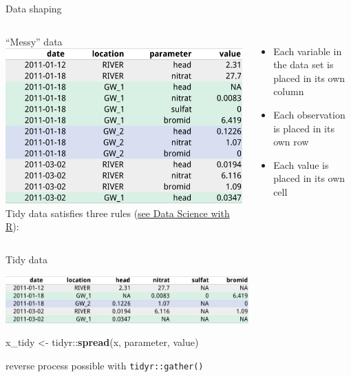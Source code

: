 \documentclass[8pt,ignorenonframetext,]{beamer}
\newenvironment{Shaded}{\begin{snugshade}}{\end{snugshade}}
\newcommand{\KeywordTok}[1]{\textcolor[rgb]{0.13,0.29,0.53}{\textbf{{#1}}}}
\newcommand{\StringTok}[1]{\textcolor[rgb]{0.31,0.60,0.02}{{#1}}}
\newcommand{\NormalTok}[1]{{#1}}
\providecommand{\tightlist}{%
  \setlength{\itemsep}{0pt}\setlength{\parskip}{0pt}}
\newcommand{\columnsbegin}{\begin{columns}}
\newcommand{\columnsend}{\end{columns}}
\begin{document}
\begin{frame}[fragile]{Data shaping}

\columnsbegin
{} ``Messy'' data
\includegraphics{imgPres/data_tidying_table_messy.png}
 Tidy data satisfies three rules
(\href{http://garrettgman.github.io/tidying/}{see Data Science with R}):

\begin{itemize}
\tightlist
\item
  Each variable in the data set is placed in its own column
\item
  Each observation is placed in its own row
\item
  Each value is placed in its own cell
\end{itemize}

\columnsend

Tidy data

\includegraphics[width=0.70000\textwidth]{imgPres/data_tidying_table_tidy.png}

\begin{Shaded}
\begin{Highlighting}[]
\NormalTok{x_tidy <-}\StringTok{ }\NormalTok{tidyr::}\KeywordTok{spread}\NormalTok{(x, parameter, value)}
\end{Highlighting}
\end{Shaded}

reverse process possible with \texttt{tidyr::gather()}

\end{frame}
\end{document}

